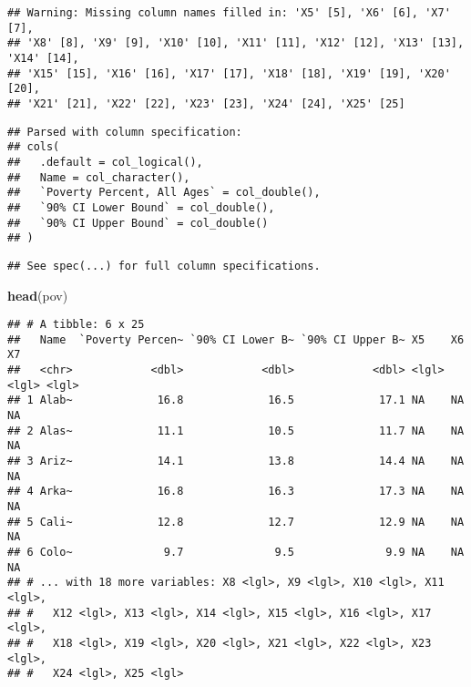 \documentclass[]{article}
\newenvironment{Shaded}{\begin{snugshade}}{\end{snugshade}}
\newcommand{\CommentTok}[1]{\textcolor[rgb]{0.56,0.35,0.01}{\textit{#1}}}
\newcommand{\DataTypeTok}[1]{\textcolor[rgb]{0.13,0.29,0.53}{#1}}
\newcommand{\DecValTok}[1]{\textcolor[rgb]{0.00,0.00,0.81}{#1}}
\newcommand{\KeywordTok}[1]{\textcolor[rgb]{0.13,0.29,0.53}{\textbf{#1}}}
\newcommand{\NormalTok}[1]{#1}
\newcommand{\StringTok}[1]{\textcolor[rgb]{0.31,0.60,0.02}{#1}}
\begin{document}
\begin{Shaded}
\end{Shaded}

\begin{verbatim}
## Warning: Missing column names filled in: 'X5' [5], 'X6' [6], 'X7' [7],
## 'X8' [8], 'X9' [9], 'X10' [10], 'X11' [11], 'X12' [12], 'X13' [13], 'X14' [14],
## 'X15' [15], 'X16' [16], 'X17' [17], 'X18' [18], 'X19' [19], 'X20' [20],
## 'X21' [21], 'X22' [22], 'X23' [23], 'X24' [24], 'X25' [25]
\end{verbatim}

\begin{verbatim}
## Parsed with column specification:
## cols(
##   .default = col_logical(),
##   Name = col_character(),
##   `Poverty Percent, All Ages` = col_double(),
##   `90% CI Lower Bound` = col_double(),
##   `90% CI Upper Bound` = col_double()
## )
\end{verbatim}

\begin{verbatim}
## See spec(...) for full column specifications.
\end{verbatim}

\begin{Shaded}
\begin{Highlighting}[]
\KeywordTok{head}\NormalTok{(pov)}
\end{Highlighting}
\end{Shaded}

\begin{verbatim}
## # A tibble: 6 x 25
##   Name  `Poverty Percen~ `90% CI Lower B~ `90% CI Upper B~ X5    X6    X7   
##   <chr>            <dbl>            <dbl>            <dbl> <lgl> <lgl> <lgl>
## 1 Alab~             16.8             16.5             17.1 NA    NA    NA   
## 2 Alas~             11.1             10.5             11.7 NA    NA    NA   
## 3 Ariz~             14.1             13.8             14.4 NA    NA    NA   
## 4 Arka~             16.8             16.3             17.3 NA    NA    NA   
## 5 Cali~             12.8             12.7             12.9 NA    NA    NA   
## 6 Colo~              9.7              9.5              9.9 NA    NA    NA   
## # ... with 18 more variables: X8 <lgl>, X9 <lgl>, X10 <lgl>, X11 <lgl>,
## #   X12 <lgl>, X13 <lgl>, X14 <lgl>, X15 <lgl>, X16 <lgl>, X17 <lgl>,
## #   X18 <lgl>, X19 <lgl>, X20 <lgl>, X21 <lgl>, X22 <lgl>, X23 <lgl>,
## #   X24 <lgl>, X25 <lgl>
\end{verbatim}
\end{document}
